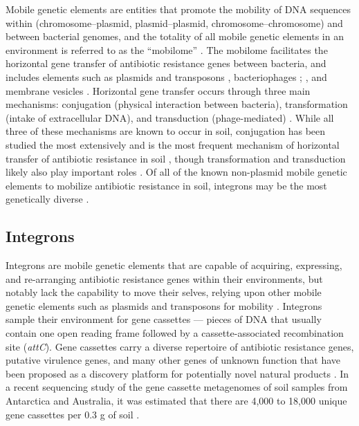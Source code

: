 Mobile genetic elements are entities that promote the mobility of DNA sequences within (chromosome–plasmid, plasmid–plasmid, chromosome–chromosome) and between bacterial genomes, and the totality of all mobile genetic elements in an environment is referred to as the “mobilome” \parencite{Partridge.2018, Perry.2013}.
The mobilome facilitates the horizontal gene transfer of antibiotic resistance genes between bacteria, and includes elements such as plasmids and transposons \parencite{Partridge.2018}, bacteriophages \parencite{Subirats.2016}; \parencite{ColomerLluch.2011}, and membrane vesicles \parencite{Chattopadhyay.2015}.
Horizontal gene transfer occurs through three main mechanisms: conjugation (physical interaction between bacteria), transformation (intake of extracellular DNA), and transduction (phage-mediated) \parencite{Partridge.2018}.
While all three of these mechanisms are known to occur in soil, conjugation has been studied the most extensively and is the most frequent mechanism of horizontal transfer of antibiotic resistance in soil \parencite{Perry.2013}, though transformation and transduction likely also play important roles \parencite{Perry.2013, Aminov.2011}.
Of all of the known non-plasmid mobile genetic elements to mobilize antibiotic resistance in soil, integrons may be the most genetically diverse \parencite{Ghaly.2019}.

\subsection{Integrons}

Integrons are mobile genetic elements that are capable of acquiring, expressing, and re-arranging antibiotic resistance genes within their environments, but notably lack the capability to move their selves, relying upon other mobile genetic elements such as plasmids and transposons for mobility \parencite{Gillings.2014}.
Integrons sample their environment for gene cassettes \parencite{Ghaly.2020} --- pieces of DNA that usually contain one open reading frame followed by a cassette-associated recombination site (\textit{attC}).
Gene cassettes carry a diverse repertoire of antibiotic resistance genes, putative virulence genes, and many other genes of unknown function that have been proposed as a discovery platform for potentially novel natural products \parencite{Ma.2017, Ghaly.2019, Ghaly.2020}.
In a recent sequencing study of the gene cassette metagenomes of soil samples from Antarctica and Australia, it was estimated that there are 4,000 to 18,000 unique gene cassettes per 0.3 g of soil \parencite{Ghaly.2019}.

